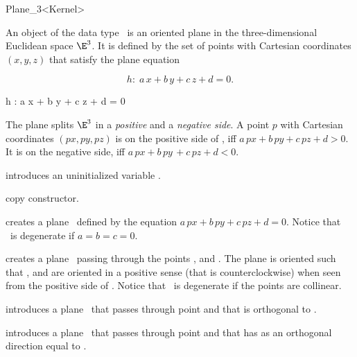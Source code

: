 \begin{ccRefClass} {Plane_3<Kernel>}

\ccDefinition 
An object  of the data type \ccRefName\ is an oriented
plane in the three-dimensional Euclidean space $\E^3$. It is defined
by the set of points with Cartesian coordinates $(x,y,z)$ that satisfy
the plane equation

\begin{ccTexOnly}
\[h :\;  a\, x +b\, y +c\, z + d = 0.\]
\end{ccTexOnly}
\begin{ccHtmlOnly}
h : a x + b y + c z + d = 0
\end{ccHtmlOnly}

The plane splits $\E^3$ in a {\em positive} and a {\em negative side}.
A point $p$ with Cartesian coordinates $(px, py, pz)$ is on the
positive side of , iff $a\, px +b\, py +c\, pz + d > 0$.
It is on the negative side, iff $a\, px +b\, py\, +c\, pz + d < 0$.

\ccCreation
{}

\ccHidden {}
             {introduces an uninitialized variable \ccVar.}

\ccHidden {}
            {copy constructor.}

{creates a plane \ccVar\ defined by the equation
 $a\, px +b\, py +c\, pz + d = 0$.
Notice that \ccVar\ is degenerate if 
 $a = b = c = 0$.}

{creates a plane \ccVar\ passing through the points ,
  and . The plane is oriented such that , 
  and  are oriented in a positive sense 
 (that is counterclockwise) when seen from the positive side of \ccVar.
Notice that \ccVar\ is degenerate if the points are collinear.}


{introduces a plane \ccVar\ that passes through point  and
 that is orthogonal to .}

{introduces a plane \ccVar\ that passes through point  and
 that has as an orthogonal direction equal to .}


\end{ccRefClass}
